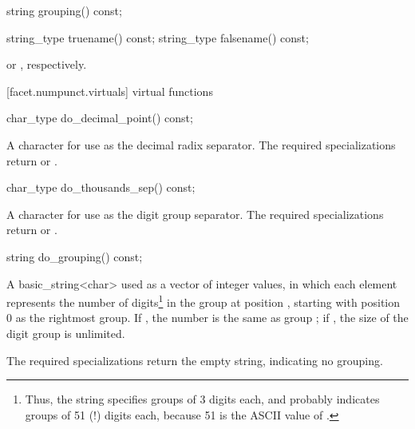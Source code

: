 %
\begin{itemdecl}
string grouping()  const;
\end{itemdecl}

\begin{itemdescr}
\pnum
\returns
{}
\end{itemdescr}

%
%
\begin{itemdecl}
string_type truename()  const;
string_type falsename() const;
\end{itemdecl}

\begin{itemdescr}
\pnum
\returns
{}
or
,
respectively.
\end{itemdescr}

[facet.numpunct.virtuals]{ virtual functions}

%
\begin{itemdecl}
char_type do_decimal_point() const;
\end{itemdecl}

\begin{itemdescr}
\pnum
\returns
A character for use as the decimal radix separator.
The required specializations return  or .
\end{itemdescr}

%
\begin{itemdecl}
char_type do_thousands_sep() const;
\end{itemdecl}

\begin{itemdescr}
\pnum
\returns
A character for use as the digit group separator.
The required specializations return  or .
\end{itemdescr}

%
\begin{itemdecl}
string do_grouping() const;
\end{itemdecl}

\begin{itemdescr}
\pnum
\returns
A basic_string<char>  used as a vector of integer values,
in which each element
represents the number of digits\footnote{Thus, the string
 specifies groups of 3 digits each, and
 probably indicates groups of 51 (!) digits each,
because 51 is the ASCII value of .}
in the group at position , starting with position 0 as the
rightmost group.
If
,
the number is the same as group
;
if
,
the size of the digit group is unlimited.

\pnum
The required specializations return the empty string, indicating
no grouping.
\end{itemdescr}

